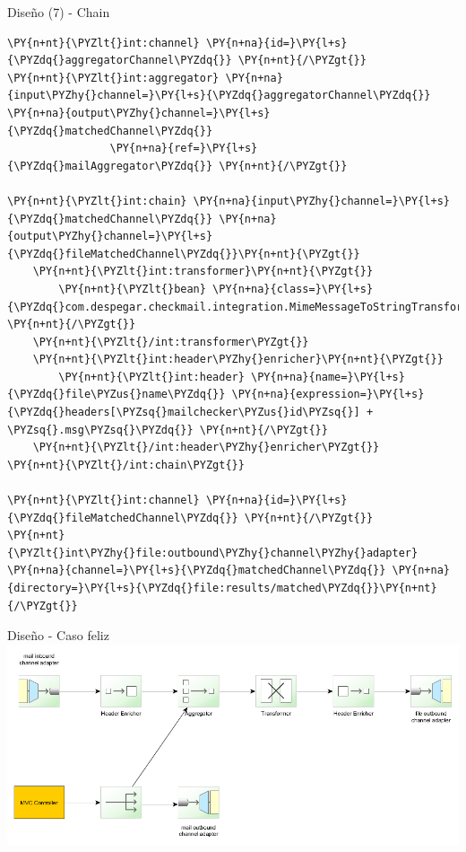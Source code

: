 \documentclass{beamer}
\begin{document}
\begin{frame}[fragile]{Diseño (7) - Chain}
\begin{Verbatim}[fontsize=\tiny,commandchars=\\\{\}]
\PY{n+nt}{\PYZlt{}int:channel} \PY{n+na}{id=}\PY{l+s}{\PYZdq{}aggregatorChannel\PYZdq{}} \PY{n+nt}{/\PYZgt{}}
\PY{n+nt}{\PYZlt{}int:aggregator} \PY{n+na}{input\PYZhy{}channel=}\PY{l+s}{\PYZdq{}aggregatorChannel\PYZdq{}} \PY{n+na}{output\PYZhy{}channel=}\PY{l+s}{\PYZdq{}matchedChannel\PYZdq{}} 
                \PY{n+na}{ref=}\PY{l+s}{\PYZdq{}mailAggregator\PYZdq{}} \PY{n+nt}{/\PYZgt{}}

\PY{n+nt}{\PYZlt{}int:chain} \PY{n+na}{input\PYZhy{}channel=}\PY{l+s}{\PYZdq{}matchedChannel\PYZdq{}} \PY{n+na}{output\PYZhy{}channel=}\PY{l+s}{\PYZdq{}fileMatchedChannel\PYZdq{}}\PY{n+nt}{\PYZgt{}}
    \PY{n+nt}{\PYZlt{}int:transformer}\PY{n+nt}{\PYZgt{}}
        \PY{n+nt}{\PYZlt{}bean} \PY{n+na}{class=}\PY{l+s}{\PYZdq{}com.despegar.checkmail.integration.MimeMessageToStringTransformer\PYZdq{}} \PY{n+nt}{/\PYZgt{}}
    \PY{n+nt}{\PYZlt{}/int:transformer\PYZgt{}}
    \PY{n+nt}{\PYZlt{}int:header\PYZhy{}enricher}\PY{n+nt}{\PYZgt{}}
        \PY{n+nt}{\PYZlt{}int:header} \PY{n+na}{name=}\PY{l+s}{\PYZdq{}file\PYZus{}name\PYZdq{}} \PY{n+na}{expression=}\PY{l+s}{\PYZdq{}headers[\PYZsq{}mailchecker\PYZus{}id\PYZsq{}] + \PYZsq{}.msg\PYZsq{}\PYZdq{}} \PY{n+nt}{/\PYZgt{}}
    \PY{n+nt}{\PYZlt{}/int:header\PYZhy{}enricher\PYZgt{}}
\PY{n+nt}{\PYZlt{}/int:chain\PYZgt{}}

\PY{n+nt}{\PYZlt{}int:channel} \PY{n+na}{id=}\PY{l+s}{\PYZdq{}fileMatchedChannel\PYZdq{}} \PY{n+nt}{/\PYZgt{}}
\PY{n+nt}{\PYZlt{}int\PYZhy{}file:outbound\PYZhy{}channel\PYZhy{}adapter} \PY{n+na}{channel=}\PY{l+s}{\PYZdq{}matchedChannel\PYZdq{}} \PY{n+na}{directory=}\PY{l+s}{\PYZdq{}file:results/matched\PYZdq{}}\PY{n+nt}{/\PYZgt{}}
\end{Verbatim}
\end{frame}

\begin{frame}{Diseño - Caso feliz}
\includegraphics[width=1.0\linewidth]{sp-int-12b}
\end{frame}
\end{document}
